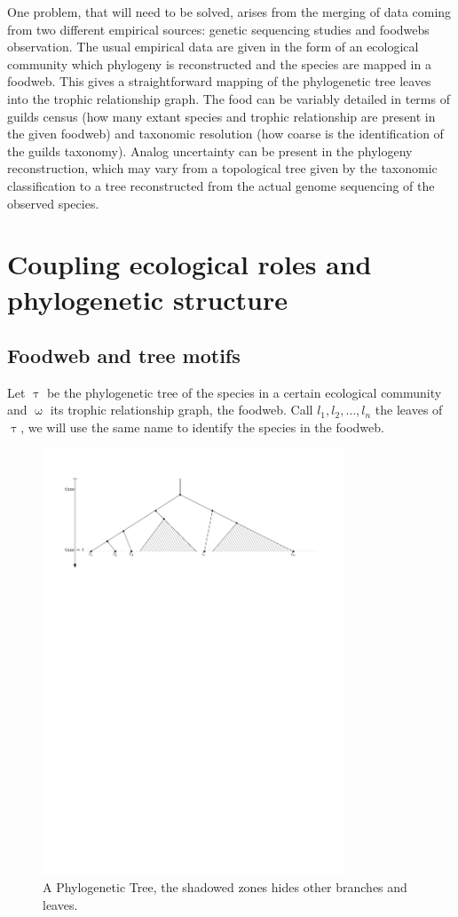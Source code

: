\documentclass[12pt,a4paper]{report}
\begin{document}
One problem, that will need to be solved, arises from the merging of data coming from two different empirical sources: genetic sequencing studies and foodwebs observation. The usual empirical data are given in the form of an ecological community which phylogeny is reconstructed and the species are mapped in a foodweb. This gives a straightforward mapping of the phylogenetic tree leaves into the trophic relationship graph. The food can be variably detailed in terms of guilds census (how many extant species and trophic relationship are present in the given foodweb) and taxonomic resolution (how coarse is the identification of the guilds taxonomy). Analog uncertainty can be present in the phylogeny reconstruction, which may vary from a topological tree given by the taxonomic classification to a tree reconstructed from the actual genome sequencing of the observed species.


\section{Coupling ecological roles and phylogenetic structure}\label{motifs_and_triplets}

\subsection{Foodweb and tree motifs}
Let $\uptau$ be the phylogenetic tree of the species in a certain ecological community and $\upomega$ its trophic relationship graph, the foodweb. Call $l_1, l_2, \dots , l_n$ the leaves of $\uptau$, we will use the same name to identify the species in the foodweb.
\begin{figure}[ht]
	\centering
		\includegraphics[width=0.8\textwidth]{images/phylogeny}
		\caption{A Phylogenetic Tree, the shadowed zones hides other branches and leaves.}
		\label{fig:phylogeny}
\end{figure}
\end{document}
